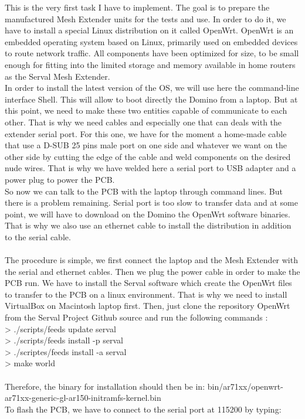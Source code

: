 This is the very first task I have to implement. The goal is to prepare the manufactured Mesh Extender units for the tests and use. In order to do it, we have to install a special Linux distribution on it called OpenWrt. OpenWrt is an embedded operating system based on Linux, primarily used on embedded devices to route network traffic. All components have been optimized for size, to be small enough for fitting into the limited storage and memory available in home routers as the Serval Mesh Extender. \\
In order to install the latest version of the OS, we will use here the command-line interface Shell. This will allow to boot directly the Domino from a laptop. But at this point, we need to make these two entities capable of communicate to each other. That is why we need cables and especially one that can deals with the extender serial port. For this one, we have for the moment a home-made cable that use a D-SUB 25 pins male port on one side and whatever we want on the other side by cutting the edge of the cable and weld components on the desired nude wires. That is why we have welded here a serial port to USB adapter and a power plug to power the PCB. \\
So now we can talk to the PCB with the laptop through command lines. But there is a problem remaining. Serial port is too slow to transfer data and at some point, we will have to download on the Domino the OpenWrt software binaries. That is why we also use an ethernet cable to install the distribution in addition to the serial cable. \\ \\ 
The procedure is simple, we first connect the laptop and the Mesh Extender with the serial and ethernet cables. Then we plug the power cable in order to make the PCB run. We have to install the Serval software which create the OpenWrt files to transfer to the PCB on a linux environment. That is why we need to install VirtualBox on Macintosh laptop first. Then, just clone the repository OpenWrt from the Serval Project Github source and run the following commands :\\
> ./scripts/feeds update serval\\
> ./scripts/feeds install -p serval\\
> ./scriptes/feeds install -a serval\\
> make world\\ \\
Therefore, the binary for installation should then be in: bin/ar71xx/openwrt-ar71xx-generic-gl-ar150-initramfs-kernel.bin \\
To flash the PCB, we have to connect to the serial port at 115200 by typing:\\

